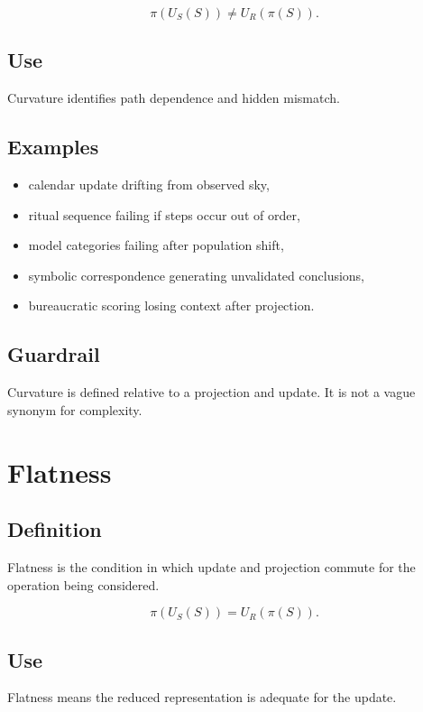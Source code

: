 \documentclass[11pt]{book}
\begin{document}
\[
\pi(U_S(S)) \neq U_R(\pi(S)).
\]

\subsection*{Use}

Curvature identifies path dependence and hidden mismatch.

\subsection*{Examples}

\begin{itemize}
    \item calendar update drifting from observed sky,
    \item ritual sequence failing if steps occur out of order,
    \item model categories failing after population shift,
    \item symbolic correspondence generating unvalidated conclusions,
    \item bureaucratic scoring losing context after projection.
\end{itemize}

\subsection*{Guardrail}

Curvature is defined relative to a projection and update. It is not a vague synonym for complexity.

\section{Flatness}

\subsection*{Definition}

Flatness is the condition in which update and projection commute for the operation being considered.

\[
\pi(U_S(S)) = U_R(\pi(S)).
\]

\subsection*{Use}

Flatness means the reduced representation is adequate for the update.
\end{document}
